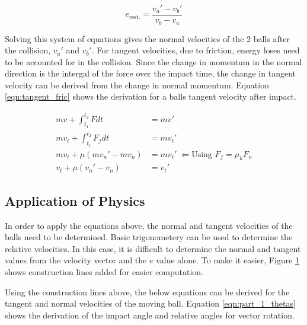 \documentclass[12pt]{article}
\begin{document}
\begin{equation}
    \label{eqn:pt1_restitution}
    e_{\text{rest.}} = \frac{v_a' - v_b'}{v_b - v_a}
\end{equation}

Solving this system of equations gives the normal velocities of the 2 balls after the collision, $v_a'$ and $v_b'$. For tangent velocities, due to friction, energy loses need to be accounted for in the collision. Since the change in momentum in the normal direction is the intergal of the force over the impact time, the change in tangent velocity can be derived from the change in normal momentum. Equation \ref{eqn:tangent_fric} shows the derivation for a balls tangent velocity after impact.

\begin{equation}
    \label{eqn:tangent_fric}
    \begin{aligned}
        mv + \int_{t_1}^{t_2} Fdt &= mv' \\
        mv_t + \int_{t_1}^{t_2} F_f dt &= mv_t' \\
        mv_t + \mu\left(mv_n' - mv_n\right) &= mv_t' \ \Leftarrow \text{Using $F_f = \mu_k F_n$}\\
        v_t + \mu\left(v_n' - v_n\right) &= v_t'
    \end{aligned}
\end{equation}

\subsection{Application of Physics}
In order to apply the equations above, the normal and tangent velocities of the balls need to be determined. Basic trigonometery can be used to determine the relative velocities. In this case, it is difficult to determine the normal and tangent values from the velocity vector and the $e$ value alone. To make it easier, Figure \ref{P1_diag_exp} shows construction lines added for easier computation.

\begin{figure}[H]
    \centering
    
    \label{P1_diag_exp}
\end{figure}

Using the construction lines above, the below equations can be derived for the tangent and normal velocities of the moving ball. Equation \ref{eqn:part_1_thetas} shows the derivation of the impact angle and relative angles for vector rotation.
\end{document}
